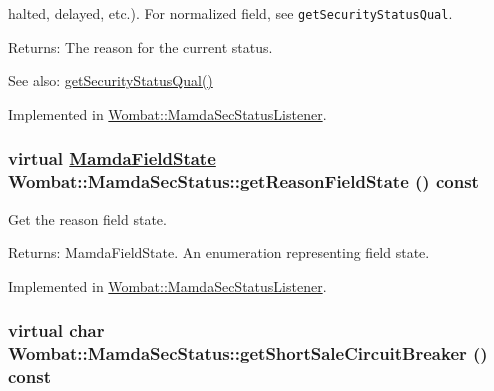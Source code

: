 halted, delayed, etc.). For normalized field, see {\tt get\-Security\-Status\-Qual}.

\begin{Desc}
\item[Returns:]The reason for the current status. \end{Desc}
\begin{Desc}
\item[See also:]\hyperlink{classWombat_1_1MamdaSecStatus_c75f88870e36e581ef460d88c0fa4719}{get\-Security\-Status\-Qual()} \end{Desc}


Implemented in \hyperlink{classWombat_1_1MamdaSecStatusListener_71962c3d0ecd60a689324e68180b4e35}{Wombat::Mamda\-Sec\-Status\-Listener}.\hypertarget{classWombat_1_1MamdaSecStatus_63fcfbc175a0bab1fcf500007b831974}{
\subsubsection[getReasonFieldState]{\setlength{\rightskip}{0pt plus 5cm}virtual \hyperlink{namespaceWombat_93aac974f2ab713554fd12a1fa3b7d2a}{Mamda\-Field\-State} Wombat::Mamda\-Sec\-Status::get\-Reason\-Field\-State () const}}
\label{classWombat_1_1MamdaSecStatus_63fcfbc175a0bab1fcf500007b831974}


Get the reason field state. 

\begin{Desc}
\item[Returns:]Mamda\-Field\-State. An enumeration representing field state. \end{Desc}


Implemented in \hyperlink{classWombat_1_1MamdaSecStatusListener_b24a32e99973888050277f1cac1a23f5}{Wombat::Mamda\-Sec\-Status\-Listener}.\hypertarget{classWombat_1_1MamdaSecStatus_018c6d2c254aa4534d75b37a2d162061}{
\subsubsection[getShortSaleCircuitBreaker]{\setlength{\rightskip}{0pt plus 5cm}virtual char Wombat::Mamda\-Sec\-Status::get\-Short\-Sale\-Circuit\-Breaker () const}}
\label{classWombat_1_1MamdaSecStatus_018c6d2c254aa4534d75b37a2d162061}


